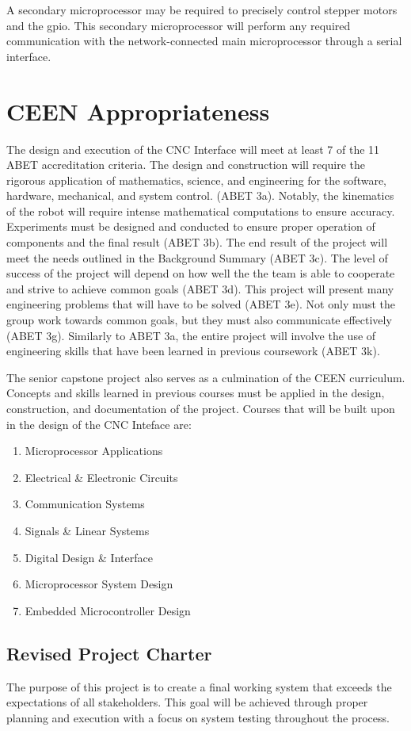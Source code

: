 A secondary microprocessor may be required to precisely control stepper motors and the \gls{gpio}.
This secondary microprocessor will perform any required communication with the network-connected main microprocessor through a serial interface. 

\section{CEEN Appropriateness}
The design and execution of the CNC Interface will meet at least 7 of the 11 ABET accreditation criteria.
The design and construction will require the rigorous application of mathematics, science, and engineering for the software, hardware, mechanical, and system control. (ABET 3a).
Notably, the kinematics of the robot will require intense mathematical computations to ensure accuracy.
Experiments must be designed and conducted to ensure proper operation of components and the final result (ABET 3b).
The end result of the project will meet the needs outlined in the Background Summary (ABET 3c).
The level of success of the project will depend on how well the the team is able to cooperate and strive to achieve common goals (ABET 3d).
This project will present many engineering problems that will have to be solved (ABET 3e).
Not only must the group work towards common goals, but they must also communicate effectively (ABET 3g).
Similarly to ABET 3a, the entire project will involve the use of engineering skills that have been learned in previous coursework (ABET 3k).

The senior capstone project also serves as a culmination of the CEEN curriculum. Concepts and skills learned in previous courses must be applied in the design, construction, and documentation of the project.
Courses that will be built upon in the design of the CNC Inteface are:
\begin{enumerate} \parskip2pt
	\item Microprocessor Applications
	\item Electrical \& Electronic Circuits
	\item Communication Systems
	\item Signals \& Linear Systems
	\item Digital Design \& Interface
	\item Microprocessor System Design
	\item Embedded Microcontroller Design
\end{enumerate}

\subsection{Revised Project Charter}
The purpose of this project is to create a final working system that exceeds the expectations of all stakeholders. This goal will be achieved through proper planning and execution with a focus on system testing throughout the process.

